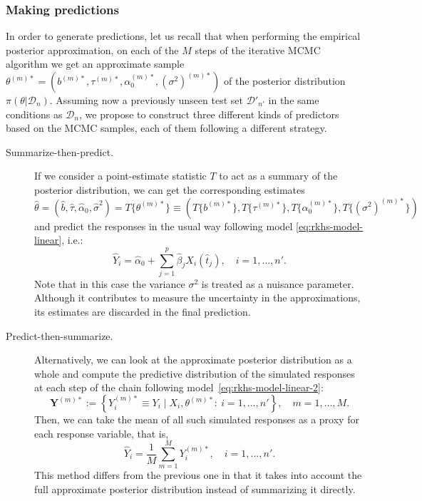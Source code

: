 \documentclass[ba]{imsart}
\numberwithin{equation}{section}
\theoremstyle{plain}
\begin{document}
\subsubsection{Making predictions}

In order to generate predictions, let us recall that when performing the empirical posterior approximation, on each of the \(M\) steps of the iterative MCMC algorithm we get an approximate sample \(\theta^{(m)*}=(b^{(m)*}, \tau^{(m)*}, \alpha_0^{(m)*}, (\sigma^2)^{(m)*})\) of the posterior distribution \(\pi(\theta| \mathcal D_n)\). Assuming now a previously unseen test set \(\mathcal D'_{n'}\) in the same conditions as \(\mathcal D_n\), we propose to construct three different kinds of predictors based on the MCMC samples, each of them following a different strategy.

\begin{description}
  \item[Summarize-then-predict.] If we consider a point-estimate statistic \(T\) to act as a summary of the posterior distribution, we can get the corresponding estimates \(\hat{\theta}=(\hat b, \hat \tau, \hat{\alpha}_0, \hat{\sigma}^2) = T\{\theta^{(m)*}\} \equiv (T\{b^{(m)*}\}, T\{\tau^{(m)*}\}, T\{\alpha_0^{(m)*}\}, T\{(\sigma^2)^{(m)*}\})\) and predict the responses in the usual way following model \eqref{eq:rkhs-model-linear}, i.e.:
  \[
    \hat Y_i = \hat{\alpha}_0 + \sum_{j=1}^p \hat{\beta}_j X_i(\hat{t}_j), \quad i=1,\dots, n'.
  \]
  Note that in this case the variance \(\sigma^2\) is treated as a nuisance parameter. Although it contributes to measure the uncertainty in the approximations, its estimates are discarded in the final prediction.

  \item[Predict-then-summarize.] Alternatively, we can  look at the approximate posterior distribution as a whole and compute the predictive distribution of the simulated responses at each step of the chain following model~\eqref{eq:rkhs-model-linear-2}:
  \begin{equation}\label{eq:sampled-response-vector}
  \bm Y^{(m)*} := \left\{Y_i^{(m)*} \equiv Y_i \mid X_i, \theta^{(m)*}:\ i=1,\dots,n'\right\}, \quad m=1,\dots,M.
  \end{equation}
  Then, we can take the mean of all such simulated responses as a proxy for each response variable, that is,
  \[
  \hat Y_i = \frac{1}{M}\sum_{m=1}^M Y_i^{(m)*}, \quad i=1,\dots,n'.
  \]
  This method differs from the previous one in that it takes into account the full approximate posterior distribution instead of summarizing it directly.


\end{description}
\end{document}

